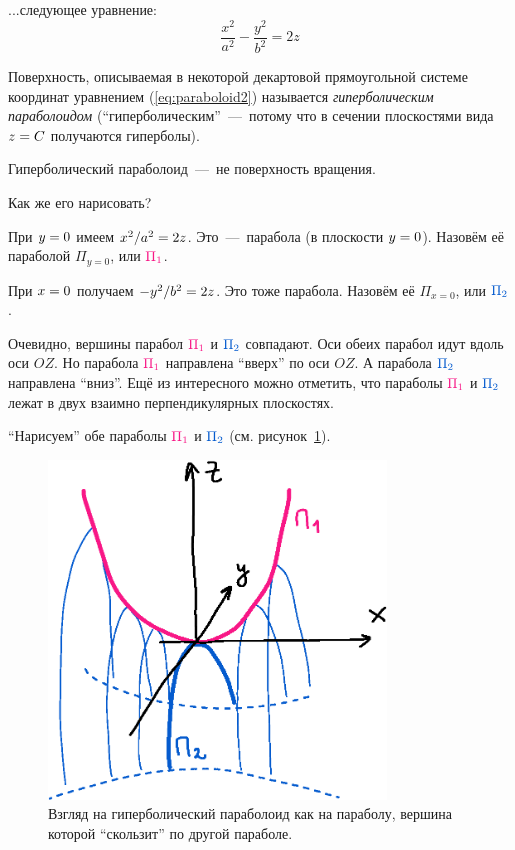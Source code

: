 \documentclass[a4paper,12pt]{article}
\begin{document}
  ...следующее уравнение:
  \begin{equation}
    \label{eq:paraboloid2}
    \boxed{
      \frac{x^2}{a^2} - \frac{y^2}{b^2} = 2z
    }
  \end{equation}
  
  Поверхность, описываемая в некоторой декартовой прямоугольной системе координат уравнением (\ref{eq:paraboloid2}) называется \emph{гиперболическим параболоидом} (``гиперболическим''~---~потому что в сечении плоскостями вида $z \hm= C$ получаются гиперболы).
  
  Гиперболический параболоид~---~не поверхность вращения.
  
  Как же его нарисовать?
  
  При $y \hm= 0$ имеем $x^2 \hm/ a^2 \hm= 2z$.
  Это~---~парабола (в плоскости $y \hm= 0$).
  Назовём её параболой $\Pi_{y=0}$, или $\textcolor{my-red}{\Pi_1}$.
  
  При $x \hm= 0$ получаем $-y^2 \hm/ b^2 \hm= 2z$.
  Это тоже парабола.
  Назовём её $\Pi_{x=0}$, или $\textcolor{my-blue}{\Pi_2}$.
  
  Очевидно, вершины парабол $\textcolor{my-red}{\Pi_1}$ и $\textcolor{my-blue}{\Pi_2}$ совпадают.
  Оси обеих парабол идут вдоль оси $OZ$.
  Но парабола $\textcolor{my-red}{\Pi_1}$ направлена ``вверх'' по оси $OZ$.
  А парабола $\textcolor{my-blue}{\Pi_2}$ направлена ``вниз''.
  Ещё из интересного можно отметить, что параболы $\textcolor{my-red}{\Pi_1}$ и $\textcolor{my-blue}{\Pi_2}$ лежат в двух взаимно перпендикулярных плоскостях.
  
  ``Нарисуем'' обе параболы $\textcolor{my-red}{\Pi_1}$ и $\textcolor{my-blue}{\Pi_2}$ (см. рисунок~\ref{fig:parabola-kinda-rotate-2}).
  
  \begin{figure}[h]
    \centering

    \includegraphics[width=0.8\textwidth]{parabola-kinda-rotate-2}
  
    \caption{Взгляд на гиперболический параболоид как на параболу, вершина которой ``скользит'' по другой параболе.}
    \label{fig:parabola-kinda-rotate-2}
  \end{figure}
  
\end{document}
